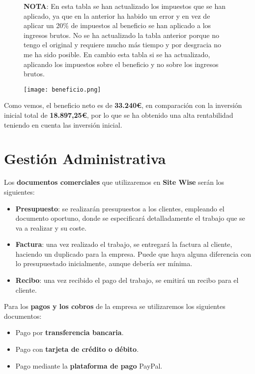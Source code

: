 \begin{figure}[H]
    \begin{tcolorbox}[sharp corners, colback=yellow!30, colframe=white!20]
        \scriptsize
\textbf{NOTA}: En esta tabla se han actualizado los impuestos que se han aplicado, ya que en la anterior ha habido un error y en vez de aplicar un 20\% de impuestos al beneficio se han aplicado a los ingresos brutos. No se ha actualizado la tabla anterior porque no tengo el original y requiere mucho más tiempo y por desgracia no me ha sido posible. En cambio esta tabla si se ha actualizado, aplicando los impuestos sobre el beneficio y no sobre los ingresos brutos.
    \end{tcolorbox}
\end{figure}


\begin{figure}[H]
    \centering
    \texttt{[image: beneficio.png]}
\end{figure}

Como vemos, el beneficio neto es de \textbf{33.240€}, en comparación con la inversión inicial total de \textbf{18.897,25€}, por lo que se ha obtenido una alta rentabilidad teniendo en cuenta las inversión inicial.

\section{Gestión Administrativa}
Los \textbf{documentos comerciales} que utilizaremos en \textbf{Site Wise} serán los siguientes:

\begin{itemize}
    \item \textbf{Presupuesto}: se realizarán presupuestos a los clientes, empleando el documento oportuno, donde se especificará detalladamente el trabajo que se va a realizar y su coste.
    \item \textbf{Factura}: una vez realizado el trabajo, se entregará la factura al cliente, haciendo un duplicado para la empresa. Puede que haya alguna diferencia con lo presupuestado inicialmente, aunque debería ser mínima.
    \item \textbf{Recibo}: una vez recibido el pago del trabajo, se emitirá un recibo para el cliente.
\end{itemize}

Para los \textbf{pagos y los cobros} de la empresa se utilizaremos los siguientes documentos:

\begin{itemize}
    \item Pago por \textbf{transferencia bancaria}.
    \item Pago con \textbf{tarjeta de crédito o débito}.
    \item Pago mediante la \textbf{plataforma de pago} PayPal.
\end{itemize}

